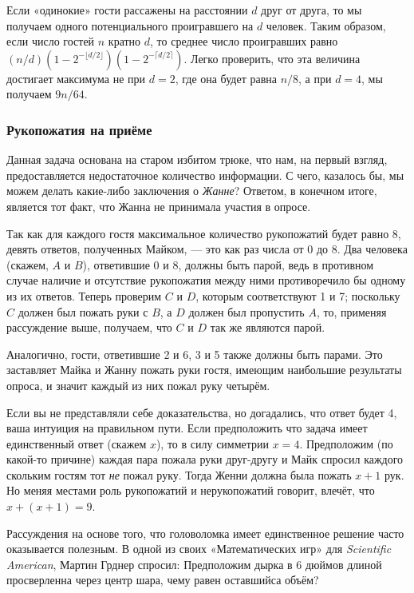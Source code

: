 Если «одинокие» гости рассажены на расстоянии $d$ друг от друга, то мы получаем одного потенциального проигравшего на $d$ человек.
Таким образом, если число гостей $n$ кратно $d$, то среднее число проигравших равно $(n/d)(1-2^{-\lfloor d/2\rfloor})(1-2^{-\lceil d/2\rceil})$.
Легко проверить, что эта величина достигает максимума не при $d=2$, где она будет равна $n/8$, а при $d=4$, мы получаем $9n/64$.\heart

\subsubsection*{Рукопожатия на приёме}%

Данная задача основана на старом избитом трюке, что нам, на первый взгляд, предоставляется недостаточное количество информации.
С чего, казалось бы, мы можем делать какие-либо заключения о \emph{Жанне}?
Ответом, в конечном итоге, является тот факт, что Жанна не принимала участия в опросе.

Так как для каждого гостя максимальное количество рукопожатий будет равно 8, 
девять ответов, полученных Майком, --- это как раз числа от 0 до 8.
Два человека (скажем, $A$ и $B$), ответившие 0 и 8, должны быть парой, ведь в противном случае наличие и отсутствие рукопожатия между ними противоречило бы одному из их ответов.
Теперь проверим $C$ и $D$, которым соответствуют 1 и 7;
поскольку $C$ должен был пожать руки с $B$, а $D$ должен был пропустить $A$, то, применяя рассуждение выше, получаем, что $C$ и $D$ так же являются парой.

Аналогично, гости, ответившие 2 и 6, 3 и 5 также должны быть парами.
Это заставляет Майка и Жанну пожать руки гостя, имеющим наибольшие результаты опроса, и значит каждый из них пожал руку четырём.
\heart

Если вы не представляли себе доказательства, но догадались, что ответ будет 4, ваша интуиция на правильном пути.
Если предположить что задача имеет единственный ответ (скажем $x$), то в силу симметрии $x=4$.
Предположим (по какой-то причине) каждая пара пожала руки друг-другу и Майк спросил каждого скольким гостям тот \emph{не} пожал руку.
Тогда Женни должна была пожать $x+1$ рук.
Но меняя местами роль рукопожатий и нерукопожатий говорит, влечёт, что $x+(x+1)=9$.


Рассуждения на основе того, что головоломка имеет единственное решение часто оказывается полезным.
В одной из своих «Математических игр» для \emph{Scientific American}, Мартин Грднер спросил:
Предположим дырка в 6 дюймов длиной просверленна через центр шара, чему равен оставшийса объём?

